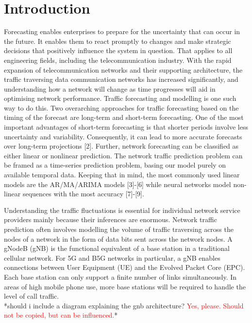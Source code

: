\documentclass[conference]{IEEEtran}
\begin{document}
\section{Introduction}
Forecasting enables enterprises to prepare for the uncertainty that can occur in the future. It enables them to react promptly to changes and make strategic decisions that positively influence the system in question. That applies to all engineering fields, including the telecommunication industry. With the rapid expansion of telecommunication networks and their supporting architecture, the traffic traversing data communication networks has increased significantly, and understanding how a network will change as time progresses will aid in optimising network performance\cite{r1}. Traffic forecasting and modelling is one such way to do this. Two overarching approaches for traffic forecasting based on the timing of the forecast are long-term and short-term forecasting. One of the most important advantages of short-term forecasting is that shorter periods involve less uncertainty and variability. Consequently, it can lead to more accurate forecasts over long-term projections [2]. Further, network forecasting  can be classified as either linear or nonlinear prediction. The network traffic prediction problem can be framed as a time-series prediction problem, basing our model purely on available temporal data. Keeping that in mind, the most commonly used linear models are the AR/MA/ARIMA models [3]-[6] while neural networks model non-linear sequences with the most accuracy [7]-[9].

Understanding the traffic fluctuations is essential for individual network service providers mainly because their inferences are enormous. Network traffic prediction often involves modelling the volume of traffic traversing across the nodes of a network in the form of data bits sent across the network nodes. A gNodeB (gNB) is the functional equivalent of a base station in a traditional cellular network. For 5G and B5G networks in particular, a gNB enables connections between User Equipment (UE) and the Evolved Packet Core (EPC). Each base station can only support a finite number of links simultaneously. In areas of high mobile phone use, more base stations will be required to handle the level of call traffic. \\

*should i include a diagram explaining the gnb architecture?\textcolor{red}{ Yes, please. Should not be copied, but can be influenced.}*
\\
\end{document}
